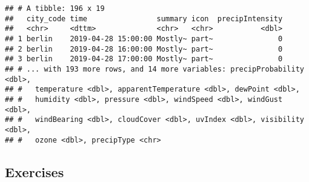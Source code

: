 \documentclass[]{book}
\begin{document}
\begin{verbatim}
## # A tibble: 196 x 19
##   city_code time                summary icon  precipIntensity
##   <chr>     <dttm>              <chr>   <chr>           <dbl>
## 1 berlin    2019-04-28 15:00:00 Mostly~ part~               0
## 2 berlin    2019-04-28 16:00:00 Mostly~ part~               0
## 3 berlin    2019-04-28 17:00:00 Mostly~ part~               0
## # ... with 193 more rows, and 14 more variables: precipProbability <dbl>,
## #   temperature <dbl>, apparentTemperature <dbl>, dewPoint <dbl>,
## #   humidity <dbl>, pressure <dbl>, windSpeed <dbl>, windGust <dbl>,
## #   windBearing <dbl>, cloudCover <dbl>, uvIndex <dbl>, visibility <dbl>,
## #   ozone <dbl>, precipType <chr>
\end{verbatim}

\hypertarget{exercises-2}{%
\subsection{Exercises}\label{exercises-2}}
\end{document}
